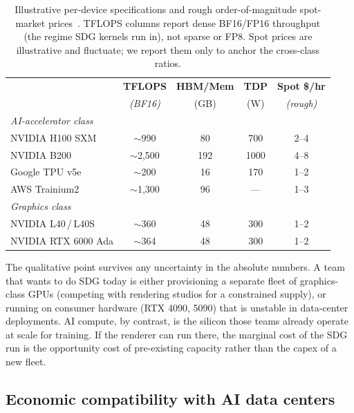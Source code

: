 \documentclass[10pt,journal,onecolumn]{IEEEtran}
\begin{document}
\begin{table}[t]
\centering
\caption{Illustrative per-device specifications and rough order-of-magnitude
spot-market prices~\cite{nvidia-hopper-h100,nvidia-blackwell-b200,nvidia-l40,google-tpu-v5}.
TFLOPS columns report dense BF16\slash FP16 throughput (the regime SDG
kernels run in), not sparse or FP8. Spot prices are illustrative and
fluctuate; we report them only to anchor the cross-class ratios.}
\label{tab:hardware}
\small
\begin{tabular}{@{}lcccc@{}}
\toprule
& \textbf{TFLOPS} & \textbf{HBM/Mem} & \textbf{TDP} & \textbf{Spot \$/hr} \\
& \textit{(BF16)} & (GB) & (W) & \textit{(rough)} \\
\midrule
\textit{AI-accelerator class} & & & & \\
NVIDIA H100 SXM   &  $\sim$990  & 80   & 700  & 2--4  \\
NVIDIA B200       & $\sim$2{,}500 & 192 & 1000 & 4--8  \\
Google TPU v5e    &  $\sim$200  & 16   & 170  & 1--2  \\
AWS Trainium2     &  $\sim$1{,}300 & 96 & ---  & 1--3  \\
\midrule
\textit{Graphics class}       & & & & \\
NVIDIA L40\,/\,L40S         &  $\sim$360  & 48   & 300  & 1--2 \\
NVIDIA RTX 6000 Ada         &  $\sim$364  & 48   & 300  & 1--2 \\
\bottomrule
\end{tabular}
\end{table}

The qualitative point survives any uncertainty in the absolute numbers.
A team that wants to do SDG today is either provisioning a separate
fleet of graphics-class GPUs (competing with rendering studios for a
constrained supply), or running on consumer hardware (RTX 4090, 5090)
that is unstable in data-center deployments. AI compute, by contrast,
is the silicon those teams already operate at scale for training. If
the renderer can run there, the marginal cost of the SDG run is the
opportunity cost of pre-existing capacity rather than the capex of a
new fleet.

\subsection{Economic compatibility with AI data centers}
\label{sec:economic-case}
\end{document}
